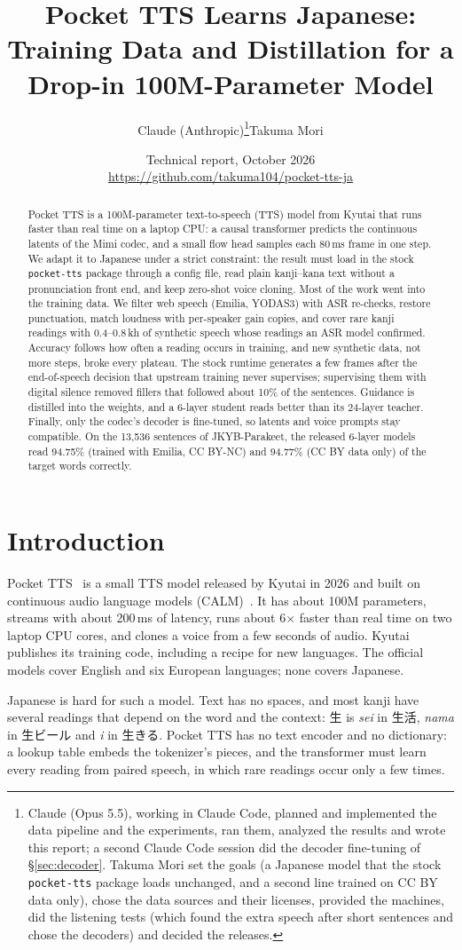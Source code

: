 \documentclass[10pt,a4paper,twocolumn]{article}
\title{\bfseries Pocket TTS Learns Japanese:\\
Training Data and Distillation for a Drop-in 100M-Parameter Model}
\author{Claude (Anthropic)\thanks{Claude (Opus 5.5), working in Claude Code, planned and implemented
the data pipeline and the experiments, ran them, analyzed the results and wrote this report; a second
Claude Code session did the decoder fine-tuning of \S\ref{sec:decoder}. Takuma Mori set the goals (a
Japanese model that the stock \texttt{pocket-tts} package loads unchanged, and a second line trained on
CC BY data only), chose the data sources and their licenses, provided the machines, did the listening
tests (which found the extra speech after short sentences and chose the decoders) and decided the
releases.}\qquad Takuma Mori}
\date{{\small Technical report, October 2026}\\
{\small\url{https://github.com/takuma104/pocket-tts-ja}}}
\begin{document}
\maketitle

\begin{abstract}
Pocket TTS is a 100M-parameter text-to-speech (TTS) model from Kyutai that runs faster than real
time on a laptop CPU: a causal transformer predicts the continuous latents of the Mimi codec, and a
small flow head samples each 80\,ms frame in one step. We adapt it to Japanese under a strict
constraint: the result must load in the stock \texttt{pocket-tts} package through a config file,
read plain kanji--kana text without a pronunciation front end, and keep zero-shot voice cloning.
Most of the work went into the training data. We filter web speech (Emilia, YODAS3) with ASR
re-checks, restore punctuation, match loudness with per-speaker gain copies, and cover rare kanji
readings with 0.4--0.8\,kh of synthetic speech whose readings an ASR model confirmed. Accuracy
follows how often a reading occurs in training, and new synthetic data, not more steps, broke every
plateau. The stock runtime generates a few frames after the end-of-speech decision that upstream
training never supervises; supervising them with digital silence removed fillers that followed
about 10\% of the sentences. Guidance is distilled into the weights, and a 6-layer student reads
better than its 24-layer teacher. Finally, only the codec's decoder is fine-tuned, so latents and
voice prompts stay compatible. On the 13,536 sentences of JKYB-Parakeet, the released 6-layer models
read 94.75\% (trained with Emilia, CC BY-NC) and 94.77\% (CC BY data only) of the target words
correctly.
\end{abstract}

\section{Introduction}
Pocket TTS~\cite{pocket} is a small TTS model released by Kyutai in 2026 and built on continuous
audio language models (CALM)~\cite{calm}. It has about 100M parameters, streams with about 200\,ms of
latency, runs about 6$\times$ faster than real time on two laptop CPU cores, and clones a voice from
a few seconds of audio. Kyutai publishes its training code, including a recipe for new languages. The
official models cover English and six European languages; none covers Japanese.

Japanese is hard for such a model. Text has no spaces, and most kanji have several readings that
depend on the word and the context: 生 is \emph{sei} in 生活, \emph{nama} in 生ビール and \emph{i}
in 生きる. Pocket TTS has no text encoder and no dictionary: a lookup table embeds the tokenizer's
pieces, and the transformer must learn every reading from paired speech, in which rare readings
occur only a few times.
\end{document}
